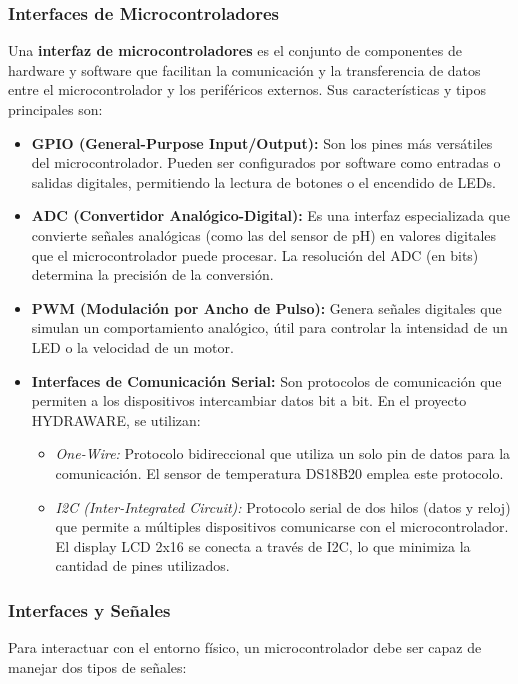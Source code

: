 \documentclass[a4paper,12pt]{article}
\begin{document}
	\subsubsection{Interfaces de Microcontroladores}
	Una \textbf{interfaz de microcontroladores} es el conjunto de componentes de hardware y software que facilitan la comunicación y la transferencia de datos entre el microcontrolador y los periféricos externos. Sus características y tipos principales son:
	
	\begin{itemize}
		\item \textbf{GPIO (General-Purpose Input/Output):} Son los pines más versátiles del microcontrolador. Pueden ser configurados por software como entradas o salidas digitales, permitiendo la lectura de botones o el encendido de LEDs.
		\item \textbf{ADC (Convertidor Analógico-Digital):} Es una interfaz especializada que convierte señales analógicas (como las del sensor de pH) en valores digitales que el microcontrolador puede procesar. La resolución del ADC (en bits) determina la precisión de la conversión.
		\item \textbf{PWM (Modulación por Ancho de Pulso):} Genera señales digitales que simulan un comportamiento analógico, útil para controlar la intensidad de un LED o la velocidad de un motor.
		\item \textbf{Interfaces de Comunicación Serial:} Son protocolos de comunicación que permiten a los dispositivos intercambiar datos bit a bit. En el proyecto HYDRAWARE, se utilizan:
		\begin{itemize}
			\item \textit{One-Wire:} Protocolo bidireccional que utiliza un solo pin de datos para la comunicación. El sensor de temperatura DS18B20 emplea este protocolo.
			\item \textit{I2C (Inter-Integrated Circuit):} Protocolo serial de dos hilos (datos y reloj) que permite a múltiples dispositivos comunicarse con el microcontrolador. El display LCD 2x16 se conecta a través de I2C, lo que minimiza la cantidad de pines utilizados.
		\end{itemize}
	\end{itemize}
	
	\subsubsection{Interfaces y Señales}
	Para interactuar con el entorno físico, un microcontrolador debe ser capaz de manejar dos tipos de señales:
	
\end{document}
